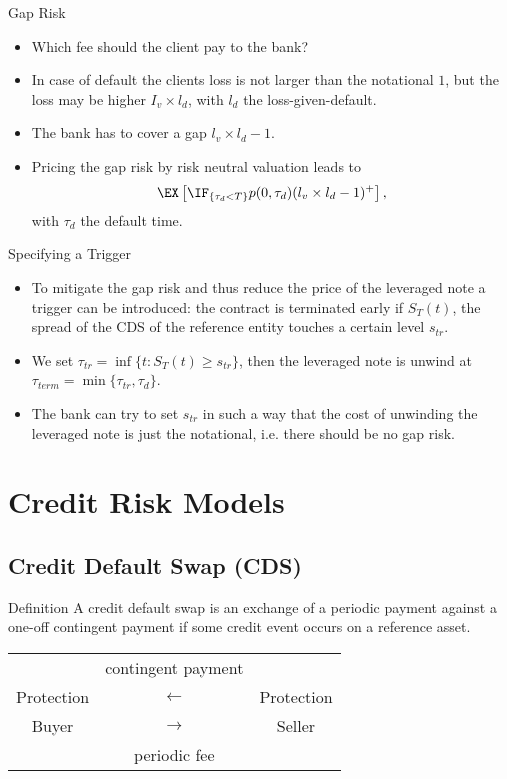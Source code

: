 {Gap Risk}
\begin{itemize}
\item<1-> Which fee should the client pay to the bank?
\item<2-> In case of default the clients loss is not larger than the notational $1$, but the loss may be higher $I_v \times l_d$, with $l_d$ the loss-given-default.
\item<3-> The bank has to cover a gap $l_v \times l_d -1$.
\item<4-> Pricing the gap risk by risk neutral valuation leads to
$$
\EX\left[\IF_{\{\tau_d < T\}} p(0,\tau_d)(l_v \times l_d -1)^+\right],
$$
with $\tau_d$ the default time.

\end{itemize}

{Specifying a Trigger}
\begin{itemize}
\item<1-> To mitigate the gap risk and thus reduce the price of the leveraged note a trigger can be introduced: the contract is terminated early if $S_T(t)$, the spread of the CDS of the reference entity touches a certain level  $s_{tr}$.
\item<2-> We set $\tau_{tr}= \inf\{t: S_T(t) \geq s_{tr}\}$, then the leveraged note is unwind at $\tau_{term}= \min\{\tau_{tr}, \tau_{d} \}$.
\item<3-> The bank can try to set $s_{tr}$ in such a way that the cost of unwinding the leveraged note is just the notational, i.e. there should be no gap risk.
\end{itemize}

\section{Credit Risk Models}
\subsection{Credit Default Swap (CDS)}

{Definition}
A credit default swap is an exchange of a periodic payment against
a one-off contingent payment if some credit event occurs on a
reference asset.

\begin{table}[htb]
\begin{center}
\begin{tabular}{ccc}
& {\small contingent payment} & \\
Protection& $\longleftarrow $ & Protection\\
Buyer & $\longrightarrow $& Seller\\
& {\small periodic fee} &
\end{tabular}
\end{center}
\end{table}

